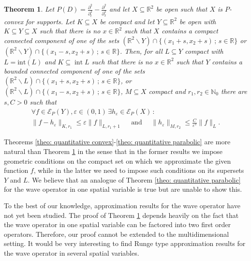 \documentclass[12pt]{amsart}
\newcommand{\N}{\mathbb{N}}
\newcommand{\R}{\mathbb{R}}
\newtheorem{theorem}{Theorem}[section]
\theoremstyle{definition}
\theoremstyle{remark}
\numberwithin{equation}{section}
\begin{document}
\begin{theorem}\label{theo: quantitative Runge for wave operator}
	Let $P(D) = \frac{\partial^2}{\partial_t^2}- \frac{\partial^2}{\partial_x^2}$ and let  $X\subseteq\R^2$ be open such that $X$ is $P$-convex for supports. Let $K \subseteq X$ be compact and let $Y \subseteq \R^2$ be open with $K \subseteq Y \subseteq X$ such that there is no  $x\in\R^2$ such that $X$ contains a compact connected component of one of the sets $(\R^2\backslash Y)\cap\{(x_1+s,x_2+s)\,;\,s\in\R\}$ or $(\R^2\backslash Y)\cap\{(x_1-s,x_2+s)\, ; \,s\in\R\}$. Then, for all $L \subseteq Y$ compact with $L=\overline{\mbox{int}(L)}$ and $K \subseteq \operatorname{int} L$  such that there is no $x\in\R^2$ such that $Y$ contains a bounded connected component of one of the sets $(\R^2\backslash L)\cap \{(x_1+s,x_2+s)\, ; \,s\in\R\}$, or $(\R^2\backslash L)\cap\{(x_1-s,x_2+s)\, ; \,s\in\R\}$, $M \subseteq X$ compact and $r_1,r_2 \in \N_0$ there are $s, C>0$ such that 
	\begin{gather*}
		\forall f\in\mathscr{E}_P(Y), \varepsilon\in (0,1) \,\exists h_\varepsilon \in\mathscr{E}_P(X) \, :\\
		\|f-h_\varepsilon\|_{K,r_1}\leq \varepsilon\|f\|_{L,r_1+1} \quad \mbox{ and } \quad \|h_\varepsilon\|_{M,r_2}\leq\frac{C}{\varepsilon^s}\|f\|_{L}.
	\end{gather*}
\end{theorem}

\noindent Theorems \ref{theo: quantitative convex}-\ref{theo: quantitative parabolic} are more natural than Theorem \ref{theo: quantitative Runge for wave operator} in the sense that in the former results we impose
geometric conditions on the compact set on which we approximate the given function $f$,  while in the latter we need to impose such conditions on its supersets $Y$ and $L$. We believe that an analogue of Theorem \ref{theo: quantitative parabolic} for the wave operator in one spatial variable is true but are unable to show this.

To the best of our knowledge, approximation results for the wave operator have not yet been studied. The proof of Theorem  \ref{theo: quantitative Runge for wave operator} depends heavily on the fact that the wave operator in one spatial variable can be factored into two first order operators. Therefore, our proof cannot be extended to the multidimensional setting.  It would be very interesting to find Runge type approximation results for the wave operator in several spatial variables.
\end{document}
